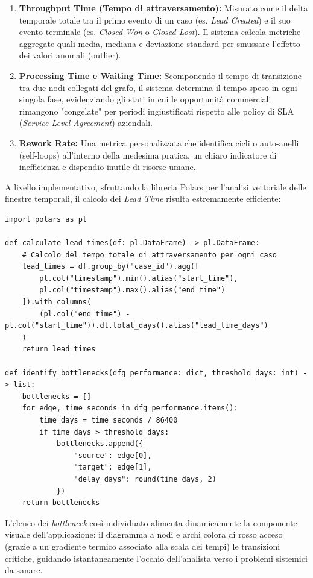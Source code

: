 \documentclass[12pt, a4paper]{report}
\begin{document}
\begin{enumerate}
    \item \textbf{Throughput Time (Tempo di attraversamento):} Misurato come il delta temporale totale tra il primo evento di un caso (es. \textit{Lead Created}) e il suo evento terminale (es. \textit{Closed Won} o \textit{Closed Lost}). Il sistema calcola metriche aggregate quali media, mediana e deviazione standard per smussare l'effetto dei valori anomali (outlier).
    \item \textbf{Processing Time e Waiting Time:} Scomponendo il tempo di transizione tra due nodi collegati del grafo, il sistema determina il tempo speso in ogni singola fase, evidenziando gli stati in cui le opportunità commerciali rimangono "congelate" per periodi ingiustificati rispetto alle policy di SLA (\textit{Service Level Agreement}) aziendali.
    \item \textbf{Rework Rate:} Una metrica personalizzata che identifica cicli o auto-anelli (self-loops) all'interno della medesima pratica, un chiaro indicatore di inefficienza e dispendio inutile di risorse umane.
\end{enumerate}

A livello implementativo, sfruttando la libreria Polars per l'analisi vettoriale delle finestre temporali, il calcolo dei \textit{Lead Time} risulta estremamente efficiente:

\begin{verbatim}
import polars as pl

def calculate_lead_times(df: pl.DataFrame) -> pl.DataFrame:
    # Calcolo del tempo totale di attraversamento per ogni caso
    lead_times = df.group_by("case_id").agg([
        pl.col("timestamp").min().alias("start_time"),
        pl.col("timestamp").max().alias("end_time")
    ]).with_columns(
        (pl.col("end_time") - pl.col("start_time")).dt.total_days().alias("lead_time_days")
    )
    return lead_times

def identify_bottlenecks(dfg_performance: dict, threshold_days: int) -> list:
    bottlenecks = []
    for edge, time_seconds in dfg_performance.items():
        time_days = time_seconds / 86400
        if time_days > threshold_days:
            bottlenecks.append({
                "source": edge[0],
                "target": edge[1],
                "delay_days": round(time_days, 2)
            })
    return bottlenecks
\end{verbatim}

L'elenco dei \textit{bottleneck} così individuato alimenta dinamicamente la componente visuale dell'applicazione: il diagramma a nodi e archi colora di rosso acceso (grazie a un gradiente termico associato alla scala dei tempi) le transizioni critiche, guidando istantaneamente l'occhio dell'analista verso i problemi sistemici da sanare.
\end{document}
